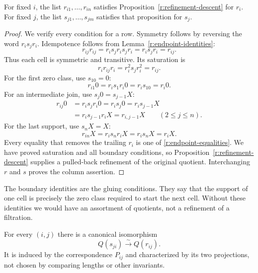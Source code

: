 \begin{proposition}
\label{r:rectangle-refines}
For fixed $i$, the list $r_{i1},\ldots,r_{in}$ satisfies
Proposition~\ref{r:refinement-descent} for $r_i$.  For fixed $j$, the list
$s_{j1},\ldots,s_{jm}$ satisfies that proposition for $s_j$.
\end{proposition}

\begin{proof}
We verify every condition for a row.  Symmetry follows by reversing the
word $r_is_jr_i$.  Idempotence follows from
Lemma~\ref{r:endpoint-identities}:
\[
 r_{ij}r_{ij}=r_is_jr_is_jr_i=r_is_jr_i=r_{ij}.
\]
Thus each cell is symmetric and transitive.  Its saturation is
\[
       r_i r_{ij}r_i=r_i^2s_jr_i^2=r_{ij}.
\]
For the first zero class, use $s_10=0$:
\[
            r_{i1}0=r_is_1r_i0=r_is_10=r_i0.
\]
For an intermediate join, use $s_j0=s_{j-1}X$:
\[
\begin{split}
 r_{ij}0
 &=r_is_jr_i0=r_is_j0
  =r_is_{j-1}X\\
 &=r_is_{j-1}r_iX=r_{i,j-1}X
                  \qquad(2\leq j\leq n).
\end{split}
\]
For the last support, use $s_nX=X$:
\[
                 r_{in}X=r_is_nr_iX=r_is_nX=r_iX.
\]
Every equality that removes the trailing $r_i$ is one of
\eqref{r:endpoint-equalities}.  We have proved saturation and all boundary
conditions, so Proposition~\ref{r:refinement-descent} supplies a
pulled-back refinement of the original quotient.  Interchanging $r$ and
$s$ proves the column assertion.
\end{proof}

The boundary identities are the gluing conditions.  They say that the
support of one cell is precisely the zero class required to start the
next cell.  Without these identities we would have an assortment of
quotients, not a refinement of a filtration.

\begin{proposition}
\label{r:cell-isomorphism}
For every $(i,j)$ there is a canonical isomorphism
\begin{equation}
\label{r:cell-iso}
                       Q(s_{ji})\xrightarrow{\ \sim\ }Q(r_{ij}).
\end{equation}
It is induced by the correspondence $P_{ij}$ and characterized by its
two projections, not chosen by comparing lengths or other invariants.
\end{proposition}

